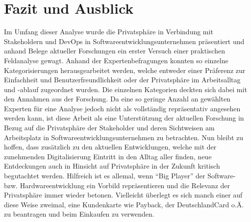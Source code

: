 \chapter{Fazit und Ausblick} %
\label{Conclusion} %

Im Umfang dieser Analyse wurde die Privatsphäre in Verbindung mit Stakeholdern und DevOps in Softwareentwicklungsunternehmen präsentiert
und anhand Belege aktueller Forschungen ein erster Versuch einer praktischen Feldanalyse gewagt. Anhand der Expertenbefragungen konnten so einzelne
Kategorisierungen herausgearbeitet werden, welche entweder einer Präferenz zur Einfachheit und Benutzerfreundlichkeit oder der Privatsphäre im Arbeitsalltag
und -ablauf zugeordnet wurden. Die einzelnen Kategorien deckten sich dabei mit den Annahmen aus der Forschung. \newline
Da eine so geringe Anzahl an gewählten Experten für eine Analyse jedoch nicht als vollständig repräsentativ angesehen werden kann, ist diese Arbeit als eine
Unterstützung der aktuellen Forschung in Bezug auf die Privatsphäre der Stakeholder und deren Sichtweisen am Arbeitsplatz in Softwareentwicklungsunternehmen
zu betrachten. \newline \newline
Nun bleibt zu hoffen, dass zusätzlich zu den aktuellen Entwicklungen, welche mit der zunehmenden Digitalisierung Eintritt in den Alltag aller finden, neue Entdeckungen
auch in Hinsicht auf Privatsphäre in der Zukunft kritisch begutachtet werden. Hilfreich ist es allemal, wenn \enquote{Big Player} der Software- bzw. Hardwareentwicklung
ein Vorbild repräsentieren und die Relevanz der Privatsphäre immer wieder betonen. \newline Vielleicht überlegt es sich manch einer auf diese Weise zweimal, eine Kundenkarte
wie Payback, der DeutschlandCard o.Ä. zu beantragen und beim Einkaufen zu verwenden.